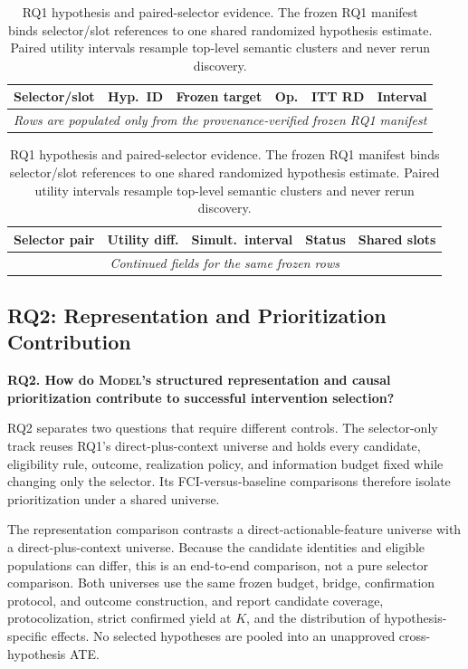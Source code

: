\documentclass[acmsmall,screen,review,anonymous]{acmart}
\newcommand{\model}{\textsc{Model}\xspace}
\begin{document}
\begin{table}[H]
  \centering
  \small
  \caption{RQ1 hypothesis and paired-selector evidence. The frozen RQ1
  manifest binds selector/slot references to one shared randomized hypothesis
  estimate. Paired utility intervals resample top-level semantic clusters and
  never rerun discovery.}
  \label{tab:rq1-evidence}
  \begin{tabular}{llllrr}
    \toprule
    Selector/slot & Hyp.\ ID & Frozen target & Op. & ITT RD & Interval \\
    \midrule
    \multicolumn{6}{c}{\emph{Rows are populated only from the
    provenance-verified frozen RQ1 manifest}} \\
    \bottomrule
  \end{tabular}

  \medskip
  \begin{tabular}{llrrl}
    \toprule
    Selector pair & Utility diff. & Simult.\ interval & Status & Shared slots \\
    \midrule
    \multicolumn{5}{c}{\emph{Continued fields for the same frozen rows}} \\
    \bottomrule
  \end{tabular}
\end{table}

\subsection{RQ2: Representation and Prioritization Contribution}

\textbf{RQ2. How do \model's structured representation and causal
prioritization contribute to successful intervention selection?}

RQ2 separates two questions that require different controls. The selector-only
track reuses RQ1's direct-plus-context universe and holds every candidate,
eligibility rule, outcome, realization policy, and information budget fixed
while changing only the selector. Its FCI-versus-baseline comparisons therefore
isolate prioritization under a shared universe.

The representation comparison contrasts a direct-actionable-feature universe
with a direct-plus-context universe. Because the candidate identities and
eligible populations can differ, this is an end-to-end comparison, not a pure
selector comparison. Both universes use the same frozen budget, bridge,
confirmation protocol, and outcome construction, and report candidate
coverage, protocolization, strict confirmed yield at $K$, and the distribution
of hypothesis-specific effects. No selected hypotheses are pooled into an
unapproved cross-hypothesis ATE.
\end{document}
